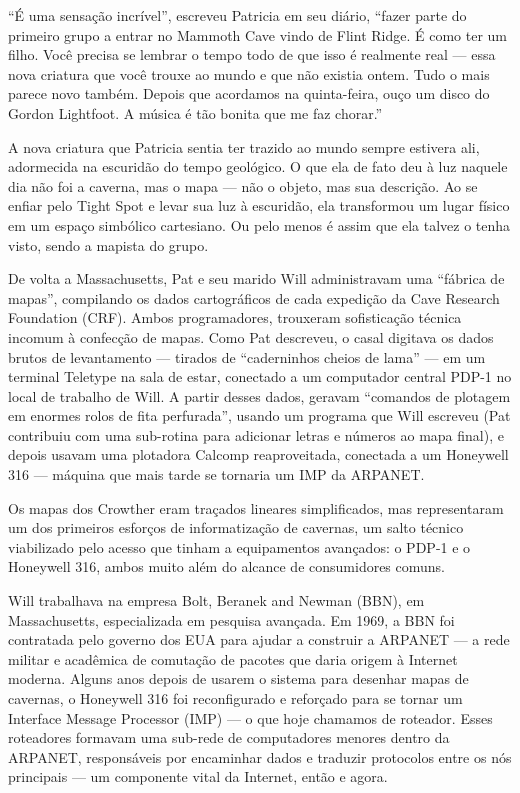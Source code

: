 \documentclass[12pt,a4paper]{article}
\begin{document}
“É uma sensação incrível”, escreveu Patricia em seu diário,
“fazer parte do primeiro grupo a entrar no Mammoth Cave vindo de Flint Ridge.
É como ter um filho. Você precisa se lembrar o tempo todo de que isso é realmente real — essa nova criatura que você trouxe ao mundo e que não existia ontem.
Tudo o mais parece novo também.
Depois que acordamos na quinta-feira, ouço um disco do Gordon Lightfoot.
A música é tão bonita que me faz chorar.”

A nova criatura que Patricia sentia ter trazido ao mundo sempre estivera ali, adormecida na escuridão do tempo geológico.
O que ela de fato deu à luz naquele dia não foi a caverna, mas o mapa — não o objeto, mas sua descrição.
Ao se enfiar pelo Tight Spot e levar sua luz à escuridão, ela transformou um lugar físico em um espaço simbólico cartesiano.
Ou pelo menos é assim que ela talvez o tenha visto, sendo a mapista do grupo.

De volta a Massachusetts, Pat e seu marido Will administravam uma “fábrica de mapas”, compilando os dados cartográficos de cada expedição da Cave Research Foundation (CRF).
Ambos programadores, trouxeram sofisticação técnica incomum à confecção de mapas.
Como Pat descreveu, o casal digitava os dados brutos de levantamento — tirados de “caderninhos cheios de lama” — em um terminal Teletype na sala de estar, conectado a um computador central PDP-1 no local de trabalho de Will.
A partir desses dados, geravam “comandos de plotagem em enormes rolos de fita perfurada”, usando um programa que Will escreveu (Pat contribuiu com uma sub-rotina para adicionar letras e números ao mapa final), e depois usavam uma plotadora Calcomp reaproveitada, conectada a um Honeywell 316 — máquina que mais tarde se tornaria um IMP da ARPANET.

Os mapas dos Crowther eram traçados lineares simplificados, mas representaram um dos primeiros esforços de informatização de cavernas, um salto técnico viabilizado pelo acesso que tinham a equipamentos avançados: o PDP-1 e o Honeywell 316, ambos muito além do alcance de consumidores comuns.

Will trabalhava na empresa Bolt, Beranek and Newman (BBN), em Massachusetts, especializada em pesquisa avançada.
Em 1969, a BBN foi contratada pelo governo dos EUA para ajudar a construir a ARPANET — a rede militar e acadêmica de comutação de pacotes que daria origem à Internet moderna.
Alguns anos depois de usarem o sistema para desenhar mapas de cavernas, o Honeywell 316 foi reconfigurado e reforçado para se tornar um Interface Message Processor (IMP) — o que hoje chamamos de roteador.
Esses roteadores formavam uma sub-rede de computadores menores dentro da ARPANET, responsáveis por encaminhar dados e traduzir protocolos entre os nós principais — um componente vital da Internet, então e agora.
\end{document}
